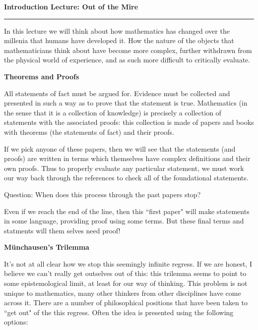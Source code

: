 \documentclass{article}
\begin{document}
\begin{center}
{\bf Introduction Lecture: Out of the Mire}
\end{center}
\hrule
\vspace{1em}

In this lecture we will think about how mathematics has changed over the millenia that humans have developed it. How the nature of the objects that mathematicians think about have become more complex, further withdrawn from the physical world of experience, and as such more difficult to critically evaluate.


\vspace{2em}
{\bf Theorems and Proofs}

All statements of fact must be argued for. Evidence must be collected and presented in such a way as to prove that the statement is true. Mathematics (in the sense that it is a collection of knowledge) is precisely a collection of statements with the associated proofs: this collection is made of papers and books with theorems (the statements of fact) and their proofs.

If we pick anyone of these papers, then we will see that the statements (and proofs) are written in terms which themselves have complex definitions and their own proofs. Thus to properly evaluate any particular statement, we must work our way back through the references to check all of the foundational statements.

\begin{center}
Question: When does this process through the past papers stop?
\end{center}

Even if we reach the end of the line, then this ``first paper" will make statements in some language, providing proof using some terms. But these final terms and statments will them selves need proof!


\vspace{2em}
{\bf M{\"u}nchausen's Trilemma}

It's not at all clear how we stop this seemingly infinite regress. If we are honest, I believe we can't really get outselves out of this: this trilemma seems to point to some epistemological limit, at least for our way of thinking. This problem is not unique to mathematics, many other thinkers from other disciplines have come across it. There are a number of philosophical positions that have been taken to ``get out" of the this regress. Often the idea is presented using the following options:
\end{document}
